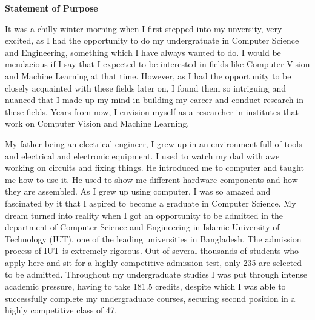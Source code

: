 \documentclass[12pt]{article}
\newcommand{\w}{2mm}
\begin{document}
\begin{center}
\textbf{Statement of Purpose} \\
\end{center}


It was a chilly winter morning when I first stepped into my unversity, very excited, as I had the opportunity to do my undergratuate in Computer Science and Engineering, something which I have always wanted to do. I would be mendacious if I say that I expected to be interested in fields like Computer Vision and Machine Learning at that time. However, as I had the opportunity to be closely acquainted with these fields later on, I found them so intriguing and nuanced that I made up my mind in building my career and conduct research in these fields. Years from now, I envision myself as a researcher in institutes that work on Computer Vision and Machine Learning.

\vspace{\w}

My father being an electrical engineer, I grew up in an environment full of tools and electrical and electronic equipment. I used to watch my dad with awe working on circuits and fixing things. He introduced me to computer and taught me how to use it. He used to show me different hardware components and how they are assembled. As I grew up using computer, I was so amazed and fascinated by it that I aspired to become a graduate in Computer Science. My dream turned into reality when I got an opportunity to be admitted in the department of Computer Science and Engineering in Islamic University of Technology (IUT), one of the leading universities in Bangladesh. The admission process of IUT is extremely rigorous. Out of several thousands of students who apply here and sit for a highly competitive admission test, only 235 are selected to be admitted. Throughout my undergraduate studies I was put through intense academic pressure, having to take 181.5 credits, despite which I was able to successfully complete my undergraduate courses, securing second position in a highly competitive class of 47.

\vspace{\w}
\end{document}
